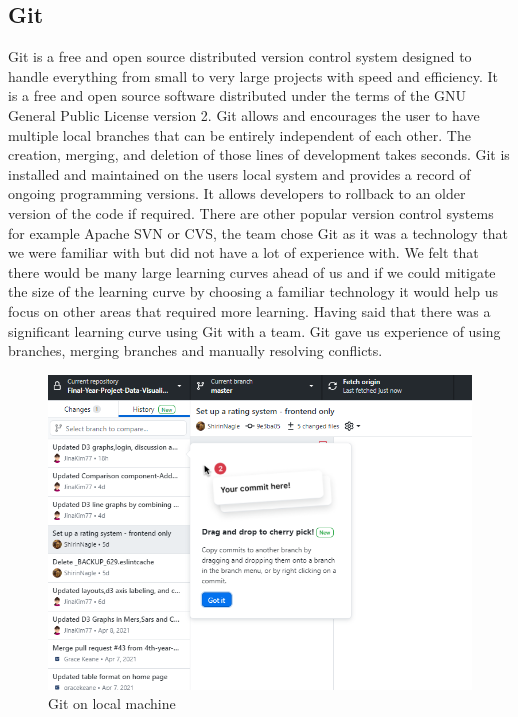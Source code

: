 \subsection{Git}
Git is a free and open source distributed version control system designed to handle everything from small to very large projects with speed and efficiency. It is a free and open source software distributed under the terms of the GNU General Public License version 2.
Git allows and encourages the user to have multiple local branches that can be entirely independent of each other. The creation, merging, and deletion of those lines of development takes seconds.\cite{git}
Git is installed and maintained on the users local system and provides a record of ongoing programming versions. It allows developers to rollback to an older version of the code if required.
There are other popular version control systems for example Apache SVN or CVS, the team chose Git as it was a technology that we were familiar with but did not have a lot of experience with. We felt that there would be many large learning curves ahead of us and if we could mitigate the size of the learning curve by choosing a familiar technology it would help us focus on other areas that required more learning. Having said that there was a significant learning curve using Git with a team. Git gave us experience of using branches, merging branches and manually resolving conflicts.
\begin{figure}
    \centering
    \includegraphics[scale=0.7]{img/git.PNG}
    \caption{Git on local machine}
    \label{fig:my_label}
\end{figure}



